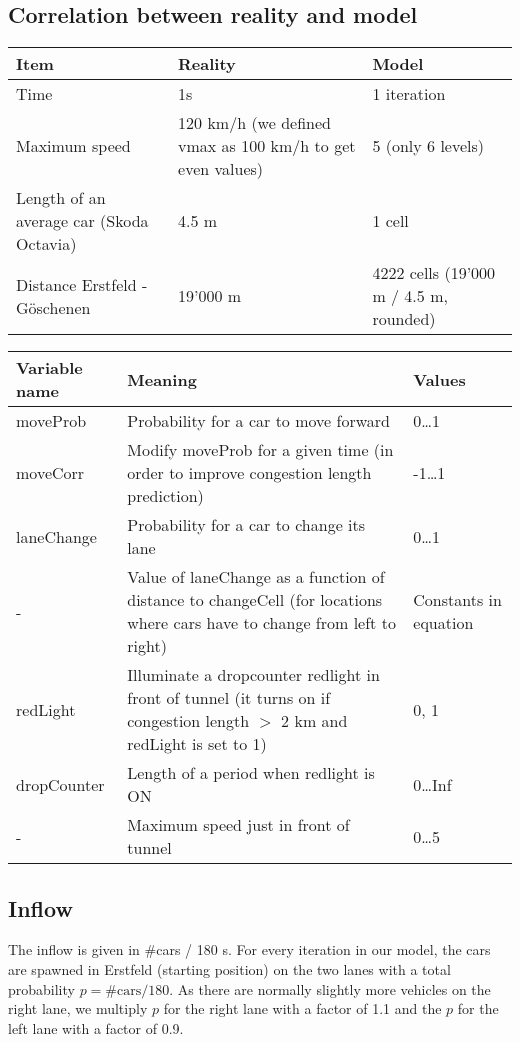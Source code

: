 
\subsection{Correlation between reality and model}

\small{
\begin{tabular}{p{} p{} p{}}
\textbf{Item}			& \textbf{Reality}	&  \textbf{Model}\\
\midrule
Time			& 1s		& 1 iteration\\
Maximum speed	& 120  km/h (we defined vmax as 100 km/h to get even values) & 5 (only 6 levels)\\
Length of an average car (Skoda Octavia) & 4.5 m & 1 cell\\
Distance Erstfeld - Göschenen & 19'000 m & 4222 cells (19'000 m / 4.5 m, rounded)
\end{tabular}

\vspace*{1.5cm}
\begin{tabular}{p{} p{} p{}}
\textbf{Variable name}	& \textbf{Meaning}	& \textbf{Values} \\
\midrule
moveProb & Probability for a car to move forward & 0\ldots 1  \\
moveCorr & Modify moveProb for a given time (in order to improve congestion length prediction) &  -1\ldots 1\\
laneChange & Probability for a car to change its lane & 0\ldots 1\\
- & Value of laneChange as a function of distance to changeCell (for locations where cars have to change from left to right) & Constants in equation\\
redLight & Illuminate a dropcounter redlight in front of tunnel (it turns on if congestion length $>$ 2 km and redLight is set to 1) & 0, 1\\
dropCounter & Length of a period when redlight is ON & 0\ldots Inf \\
- & Maximum speed just in front of tunnel & 0\ldots 5
\end{tabular}
}

\subsection{Inflow}
The inflow is given in \#cars / 180 s. For every iteration in our model, the cars are spawned in Erstfeld (starting position) on the two lanes with a total probability $p = \#\textrm{cars} / 180$. As there are normally slightly more vehicles on the right lane, we multiply $p$ for the right lane with a factor of 1.1 and the $p$ for the left lane with a factor of 0.9.

